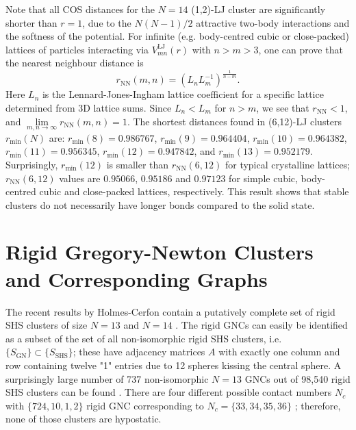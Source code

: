 Note that all \ac{COS} distances for the $N=14$ (1,2)-\ac{LJ} cluster are
significantly shorter than $r=1$, due to the $N(N-1)/2$ attractive two-body
interactions and the softness of the potential.  For infinite (e.g.
body-centred cubic or close-packed) lattices of particles interacting via
$V^\mathrm{LJ}_{mn}(r)$ with $n> m >3$, one can prove
\autocite{Schwerdtfeger_ExtensionLennardJonespotential_2006} that the nearest
neighbour distance is
%
\begin{equation}
    r_\mathrm{NN}(m,n)=\left( L_n L_m^{-1}\right)^\frac{1}{n-m}. 
    \label{eqn:lattice}
\end{equation}%
%
Here $L_n$ is the Lennard-Jones-Ingham lattice coefficient for a specific
lattice determined from 3D lattice sums.  Since $L_n<L_m$ for $n>m$, we see
that $r_\mathrm{NN}<1$, and $\lim\limits_{m,n\rightarrow
\infty}r_\mathrm{NN}(m,n)=1$.  The shortest distances found in (6,12)-\ac{LJ}
clusters $r_\text{min}(N)$ are: $r_\text{min}(8)=0.986767$,
$r_\text{min}(9)=0.964404$, $r_\text{min}(10)=0.964382$,
$r_\text{min}(11)=0.956345$, $r_\text{min}(12)=0.947842$, and
$r_\text{min}(13)=0.952179$.  Surprisingly, $r_\text{min}(12)$ is smaller than
$r_\mathrm{NN}(6,12)$ for typical crystalline lattices; $r_\mathrm{NN}(6,12)$
values are $0.95066$, $0.95186$ and $0.97123$ for simple cubic, body-centred
cubic and close-packed lattices, respectively.  This result shows that stable
clusters do not necessarily have longer bonds compared to the solid state.

\section{Rigid Gregory-Newton Clusters and Corresponding Graphs}

The recent results by Holmes-Cerfon contain a putatively complete set of rigid
SHS clusters of size $N=13$ and $N=14$
\autocite{Holmes-Cerfon_EnumeratingRigidSphere_2016}. The rigid \acp{GNC} can
easily be identified as a subset of the set of all non-isomorphic rigid SHS
clusters, i.e. $\{ S_\mathrm{GN}\}\subset \{ S_\mathrm{SHS}\}$; these have
adjacency matrices $A$ with exactly one column and row containing twelve "1"
entries due to 12 spheres kissing the central sphere. A surprisingly large
number of 737 non-isomorphic $N = 13$ \acp{GNC} out of 98,540 rigid SHS clusters
can be found \autocite{Trombach_stickyhardsphereLennardJonestypeclusters_2018}.
There are four different possible contact numbers $N_c$ with $\{724,10,1,2\}$
rigid \ac{GNC} corresponding to $N_c=\{33,34,35,36\}$
\autocite{Robinson_Arrangement24points_1961}; therefore, none of those clusters
are hypostatic.

